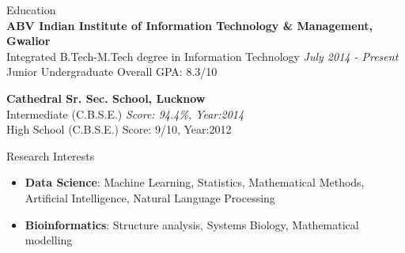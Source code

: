\documentclass{resume} %
\begin{document}

\begin{rSection}{Education}
\quad \\
{\bf ABV Indian Institute of Information Technology \& Management, Gwalior} %
\\ Integrated B.Tech-M.Tech degree in Information Technology  \hfill {\em July 2014 - Present} 
\\Junior Undergraduate  \hfill { Overall GPA: 8.3/10}

{\bf Cathedral Sr. Sec. School, Lucknow} %
\\ Intermediate (C.B.S.E.)    \hfill {\em Score: 94.4\%, Year:2014} 
\\High School (C.B.S.E.)  \hfill {Score: 9/10, Year:2012}


\end{rSection}

\begin{rSection}{Research Interests}

\begin{itemize}
\item \textbf{Data Science}: Machine Learning, Statistics, Mathematical Methods, Artificial Intelligence, Natural Language Processing
\item \textbf{Bioinformatics}: Structure analysis, Systems Biology, Mathematical modelling
\end{itemize}
\end{rSection}


\end{document}
